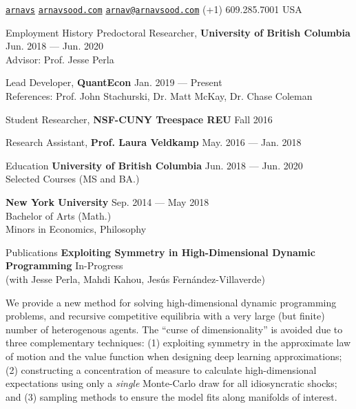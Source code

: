\documentclass{resume} %
\begin{document}
 \href{https://github.com/arnavs}{\tt arnavs} \vline \hspace{0.5 em} {} \href{https://arnavsood.com}{\tt arnavsood.com} \vline \hspace{0.5 em} {} \href{mailto:arnav@arnavsood.com}{\tt arnav@arnavsood.com} \vline \hspace{0.5 em}  (+1) 609.285.7001 \vline \hspace{0.5 em}  USA 

\begin{rSection}{Employment History}
Predoctoral Researcher, {\bf University of British Columbia} \hfill {Jun. 2018 --- Jun. 2020} 
\\ Advisor: Prof. Jesse Perla \smallskip 

Lead Developer, {\bf QuantEcon} \hfill {Jan. 2019 --- Present}
\\ References: Prof. John Stachurski, Dr. Matt McKay, Dr. Chase Coleman

Student Researcher, {\bf NSF-CUNY Treespace REU} \hfill {Fall 2016}

Research Assistant, {\bf Prof. Laura Veldkamp} \hfill {May. 2016 --- Jan. 2018}
\end{rSection}

\begin{rSection}{Education}
{\bf University of British Columbia} \hfill {Jun. 2018 --- Jun. 2020} 
\\ Selected Courses (MS and BA.)  %

{\bf New York University} \hfill {Sep. 2014 --- May 2018} 
\\ Bachelor of Arts (Math.) %
\\ Minors in Economics, Philosophy 
\end{rSection}

\begin{rSection}{Publications}
    {\bf Exploiting Symmetry in High-Dimensional Dynamic Programming} \hfill {In-Progress} 
    \\ (with Jesse Perla, Mahdi Kahou, Jes\'{u}s Fern\'{a}ndez-Villaverde)    

    We provide a new method for solving high-dimensional dynamic programming problems, and recursive competitive equilibria with a very large (but finite) number of heterogenous agents.  The ``curse of dimensionality'' is avoided due to three complementary techniques: (1) exploiting symmetry in the approximate law of motion and the value function when designing deep learning approximations; (2) constructing a concentration of measure to calculate high-dimensional expectations using only a \textit{single} Monte-Carlo draw for all idiosyncratic shocks; and (3) sampling methods to ensure the model fits along manifolds of interest. 
\end{rSection}
\end{document}
